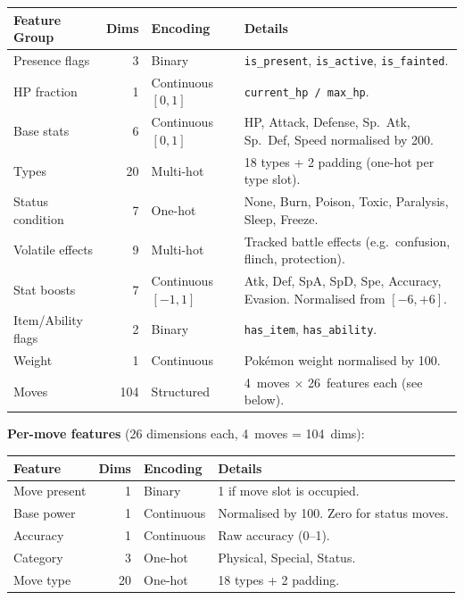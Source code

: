 \begin{center}
\small
\begin{tabularx}{\textwidth}{l r l X}
  \toprule
  \textbf{Feature Group} & \textbf{Dims} & \textbf{Encoding} & \textbf{Details} \\
  \midrule
  Presence flags    & 3  & Binary &
    \texttt{is\_present}, \texttt{is\_active}, \texttt{is\_fainted}. \\
  HP fraction       & 1  & Continuous $[0,1]$ &
    \texttt{current\_hp / max\_hp}. \\
  Base stats        & 6  & Continuous $[0,1]$ &
    HP, Attack, Defense, Sp.\ Atk, Sp.\ Def, Speed normalised by 200. \\
  Types             & 20 & Multi-hot &
    18 types + 2 padding (one-hot per type slot). \\
  Status condition  & 7  & One-hot &
    None, Burn, Poison, Toxic, Paralysis, Sleep, Freeze. \\
  Volatile effects  & 9  & Multi-hot &
    Tracked battle effects (e.g.\ confusion, flinch, protection). \\
  Stat boosts       & 7  & Continuous $[-1,1]$ &
    Atk, Def, SpA, SpD, Spe, Accuracy, Evasion.  Normalised from $[-6,+6]$. \\
  Item/Ability flags & 2 & Binary &
    \texttt{has\_item}, \texttt{has\_ability}. \\
  Weight            & 1  & Continuous &
    Pok\'{e}mon weight normalised by 100. \\
  Moves             & 104 & Structured &
    4~moves $\times$ 26~features each (see below). \\
  \bottomrule
\end{tabularx}
\end{center}

\textbf{Per-move features} (26 dimensions each, 4~moves = 104~dims):

\begin{center}
\small
\begin{tabularx}{\textwidth}{l r l X}
  \toprule
  \textbf{Feature} & \textbf{Dims} & \textbf{Encoding} & \textbf{Details} \\
  \midrule
  Move present     & 1  & Binary   & 1 if move slot is occupied. \\
  Base power       & 1  & Continuous & Normalised by 100.  Zero for status moves. \\
  Accuracy         & 1  & Continuous & Raw accuracy (0--1). \\
  Category         & 3  & One-hot  & Physical, Special, Status. \\
  Move type        & 20 & One-hot  & 18 types + 2 padding. \\
  \bottomrule
\end{tabularx}
\end{center}

